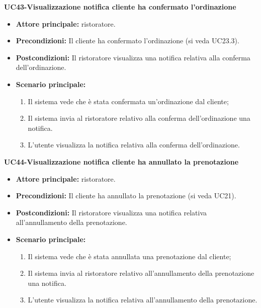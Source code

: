 \textbf{UC43-Visualizzazione notifica cliente ha confermato l'ordinazione}
\begin{itemize}
\item \textbf{Attore principale:} ristoratore.
\item \textbf{Precondizioni:} Il cliente ha confermato l'ordinazione (si veda UC23.3).
\item \textbf{Postcondizioni:} Il ristoratore visualizza una notifica relativa alla conferma dell'ordinazione.
\item \textbf{Scenario principale:}
\begin{enumerate}
    \item Il sistema vede che è stata confermata un'ordinazione dal cliente;
    \item Il sistema invia al ristoratore relativo alla conferma dell'ordinazione una notifica.
    \item L'utente visualizza la notifica relativa alla conferma dell'ordinazione.
\end{enumerate}
\end{itemize}

\textbf{UC44-Visualizzazione notifica cliente ha annullato la prenotazione}
\begin{itemize}
\item \textbf{Attore principale:} ristoratore.
\item \textbf{Precondizioni:} Il cliente ha annullato la prenotazione (si veda UC21).
\item \textbf{Postcondizioni:} Il ristoratore visualizza una notifica relativa all'annullamento della prenotazione.
\item \textbf{Scenario principale:}
\begin{enumerate}
    \item Il sistema vede che è stata annullata una prenotazione dal cliente;
    \item Il sistema invia al ristoratore relativo all'annullamento della prenotazione una notifica.
    \item L'utente visualizza la notifica relativa all'annullamento della prenotazione.
\end{enumerate}
\end{itemize}
